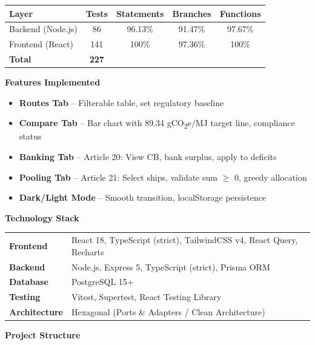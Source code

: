 \documentclass[10pt,a4paper]{article}
\begin{document}
\begin{tabular}{@{}lcccc@{}}
\toprule
\textbf{Layer} & \textbf{Tests} & \textbf{Statements} & \textbf{Branches} & \textbf{Functions} \\
\midrule
Backend (Node.js) & 86 & 96.13\% & 91.47\% & 97.67\% \\
Frontend (React) & 141 & 100\% & 97.36\% & 100\% \\
\midrule
\textbf{Total} & \textbf{227} & & & \\
\bottomrule
\end{tabular}

\vspace{0.8em}
\textbf{\large\color{darkgray} Features Implemented}
\vspace{0.3em}

\begin{itemize}[leftmargin=1.2em,itemsep=0.1em,topsep=0.2em]
    \item \textbf{Routes Tab} -- Filterable table, set regulatory baseline
    \item \textbf{Compare Tab} -- Bar chart with 89.34 gCO\textsubscript{2}e/MJ target line, compliance status
    \item \textbf{Banking Tab} -- Article 20: View CB, bank surplus, apply to deficits
    \item \textbf{Pooling Tab} -- Article 21: Select ships, validate sum $\geq$ 0, greedy allocation
    \item \textbf{Dark/Light Mode} -- Smooth transition, localStorage persistence
\end{itemize}

\vspace{0.6em}
\textbf{\large\color{darkgray} Technology Stack}
\vspace{0.4em}

\begin{tabular}{@{}ll@{}}
\textbf{Frontend} & React 18, TypeScript (strict), TailwindCSS v4, React Query, Recharts \\
\textbf{Backend} & Node.js, Express 5, TypeScript (strict), Prisma ORM \\
\textbf{Database} & PostgreSQL 15+ \\
\textbf{Testing} & Vitest, Supertest, React Testing Library \\
\textbf{Architecture} & Hexagonal (Ports \& Adapters / Clean Architecture) \\
\end{tabular}

\vspace{0.8em}
\textbf{\large\color{darkgray} Project Structure}
\vspace{0.4em}
\end{document}
